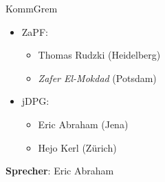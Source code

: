 \documentclass[compress, aspectratio=169]{beamer}
\begin{document}
\begin{frame}{KommGrem}
	\begin{itemize}
		\item[] ZaPF:
			\begin{itemize}
				\item Thomas Rudzki (Heidelberg)
				\item \emph{Zafer El-Mokdad} (Potsdam)
			\end{itemize}
		\item[] jDPG:
			\begin{itemize}
				\item Eric Abraham (Jena)
				\item Hejo Kerl (Zürich)
			\end{itemize}
	\end{itemize}
	\vspace{0.5cm}
	\textbf{Sprecher}: Eric Abraham
\end{frame}
\end{document}
